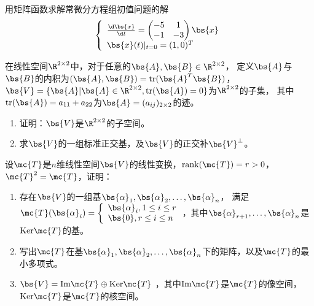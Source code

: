 \documentclass[12pt, a4paper, oneside, UTF8]{ctexbook}
\begin{document}
\begin{question}
    用矩阵函数求解常微分方程组初值问题的解
    \begin{align*}
    \left\{
        \begin{array}{ll}
            \frac{\d \bs{x}}{\d t}=\begin{pmatrix}
                -5 &1\\
                -1&-3
            \end{pmatrix}\bs{x}\\
            \bs{x}(t)|_{t=0}=(1,0)^T
        \end{array}
        \right.
    \end{align*}
\end{question}

\begin{question}
    在线性空间$\R^{2\times 2}$中，对于任意的$\bs{A},\bs{B}\in \R^{2\times 2}$，
    定义$\bs{A}$与$\bs{B}$的内积为$(\bs{A},\bs{B})=\mathrm{tr}(\bs{A}^T\bs{B})$，
    $\bs{V}=\{\bs{A}|\bs{A}\in \R^{2\times 2} ,\mathrm{tr}(\bs{A})=0\}$为$\R^{2\times2}$的子集，
    其中$\mathrm{tr}(\bs{A})=a_{11}+a_{22}$为$\bs{A}=(a_{ij})_{2\times 2}$的迹。
    \begin{enumerate}[label=(\arabic{*})]
        \item 证明：$\bs{V}$是$\R^{2\times 2}$的子空间。
        \item 求$\bs{V}$的一组标准正交基，及$\bs{V}$的正交补$\bs{V}^{\perp}$。
    \end{enumerate}
\end{question}


\begin{question}
    设$\mc{T}$是$n$维线性空间$\bs{V}$的线性变换，$\mathrm{rank}(\mc{T})=r>0$，$\mc{T}^2=\mc{T}$，证明：
    \begin{enumerate}[label=(\arabic{*})]
        \item 存在$\bs{V}$的一组基$\bs{\alpha}_1,\bs{\alpha}_2,\ldots,\bs{\alpha}_n$，
        满足$\mc{T}(\bs{\alpha}_i)=\left\{
            \begin{array}{ll}
                \bs{\alpha}_i,1\leq i\leq r\\
                \bs{0},r \leq i \leq n
            \end{array}
            \right.$，其中$\bs{\alpha}_{r+1},\ldots,\bs{\alpha}_n$是$\mathrm{Ker}\mc{T}$的基。
        \item 写出$\mc{T}$在基$\bs{\alpha}_1,\bs{\alpha}_2,\ldots,\bs{\alpha}_n$下的矩阵，以及$\mc{T}$的最小多项式。
    \item $\bs{V}=\mathrm{Im}\mc{T}\oplus \mathrm{Ker}\mc{T}$
，其中$\mathrm{Im}\mc{T}$是$\mc{T}$的像空间，$\mathrm{Ker}\mc{T}$是$\mc{T}$的核空间。
    \end{enumerate}
\end{question}

\ifx\allfiles\undefined
\end{document}

